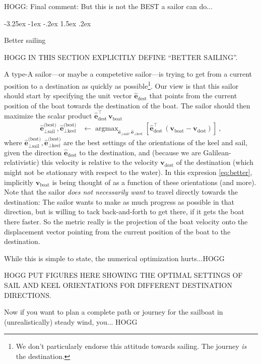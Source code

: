 \documentclass{article}
\makeatletter
\DeclareMathOperator*{\argmax}{argmax}
\renewcommand{\vec}[1]{\boldsymbol{#1}}
\newcommand{\uvec}{\vec{\hat{e}}}
\newcommand{\boat}{\text{boat}}
\newcommand{\destination}{\text{dest}}
\newcommand{\better}{\text{(best)}}
\newcommand{\sail}{\text{sail}}
\newcommand{\keel}{\text{keel}}
\newcommand{\vboat}{\vec{v}_\boat}
\newcommand{\vdest}{\vec{v}_\destination}
\renewcommand\section{\@startsection {section}{1}{\z@}%
  {-3.25ex \@plus -1ex \@minus -.2ex}%
  {1.5ex \@plus .2ex}%
  {\raggedright\normalfont\large\bfseries}}
\makeatother
\begin{document}
HOGG: Final comment: But this is not the BEST a sailor can do...

\section{Better sailing}\label{sec:better}

HOGG IN THIS SECTION EXPLICITLY DEFINE ``BETTER SAILING''.

A type-A sailor---or maybe a competetive sailor---is trying to get from a current position to a destination as quickly as possible\footnote{%
We don't particularly endorse this attitude towards sailing. The journey \emph{is} the destination.}.
Our view is that this sailor should start by specifying the unit vector $\uvec_\destination$ that points from the current position of the boat towards the destination of the boat.
The sailor should then maximize the scalar product $\uvec_\destination^\top\,\vboat$
\begin{align}\label{eq:better}
    \uvec_{\perp\sail}^\better,\uvec_{\perp\keel}^\better &\leftarrow \argmax_{\uvec_{\perp\sail},\uvec_{\perp\keel}} \left[\uvec_\destination^\top\,(\vboat-\vdest)\right] ~,
\end{align}
where $\uvec_{\perp\sail}^\better,\uvec_{\perp\keel}^\better$ are the best settings of the orientations of the keel and sail, given the direction $\uvec_\destination$ to the destination, and (because we are Galilean-relativistic) this velocity is relative to the velocity $\vdest$ of the destination (which might not be stationary with respect to the water).
In this expresion \eqref{eq:better}, implicitly $\vboat$ is being thought of as a function of these orientations (and more).
Note that the sailor \emph{does not necessarily want} to travel directly towards the destination:
The sailor wants to make as much progress as possible in that direction, but is willing to tack back-and-forth to get there, if it gets the boat there faster.
So the metric really is the projection of the boat velocity onto the displacement vector pointing from the current position of the boat to the destination.

While this is simple to state, the numerical optimization hurts...HOGG

HOGG PUT FIGURES HERE SHOWING THE OPTIMAL SETTINGS OF SAIL AND KEEL ORIENTATIONS FOR DIFFERENT DESTINATION DIRECTIONS.

Now if you want to plan a complete path or journey for the sailboat in (unrealistically) steady wind, you... HOGG
\end{document}
